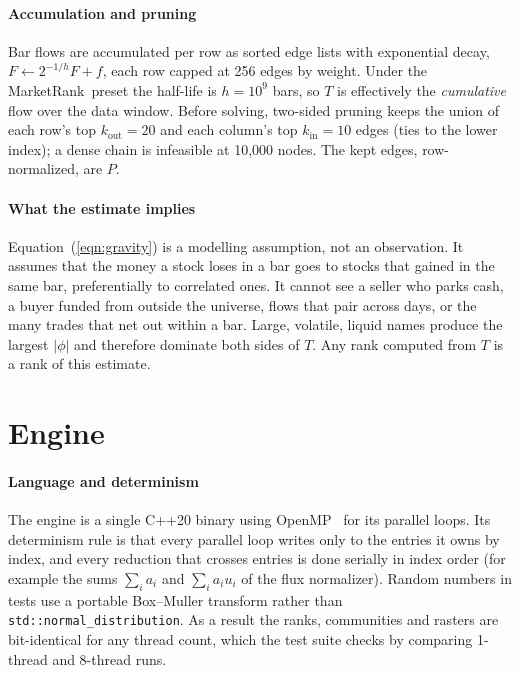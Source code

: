 \documentclass[preprint,3p,twocolumn]{elsarticle}
\newcommand{\MR}{MarketRank}
\begin{document}
\paragraph{Accumulation and pruning} Bar flows are accumulated per row as sorted edge lists with exponential decay, $F\leftarrow 2^{-1/h}F+f$, each row capped at 256 edges by weight. Under the \MR\ preset the half-life is $h=10^9$ bars, so $T$ is effectively the \emph{cumulative} flow over the data window. Before solving, two-sided pruning keeps the union of each row's top $k_{\mathrm{out}}=20$ and each column's top $k_{\mathrm{in}}=10$ edges (ties to the lower index); a dense chain is infeasible at 10,000 nodes. The kept edges, row-normalized, are $P$.

\paragraph{What the estimate implies} Equation~(\ref{eqn:gravity}) is a modelling assumption, not an observation. It assumes that the money a stock loses in a bar goes to stocks that gained in the same bar, preferentially to correlated ones. It cannot see a seller who parks cash, a buyer funded from outside the universe, flows that pair across days, or the many trades that net out within a bar. Large, volatile, liquid names produce the largest $|\phi|$ and therefore dominate both sides of $T$. Any rank computed from $T$ is a rank of this estimate.

\section{Engine}
\label{Section:engine}

\paragraph{Language and determinism} The engine is a single C++20 binary using OpenMP~\cite{openmp} for its parallel loops. Its determinism rule is that every parallel loop writes only to the entries it owns by index, and every reduction that crosses entries is done serially in index order (for example the sums $\sum_i a_i$ and $\sum_i a_i u_i$ of the flux normalizer). Random numbers in tests use a portable Box--Muller transform rather than \texttt{std::normal\_distribution}. As a result the ranks, communities and rasters are bit-identical for any thread count, which the test suite checks by comparing 1-thread and 8-thread runs.
\end{document}

